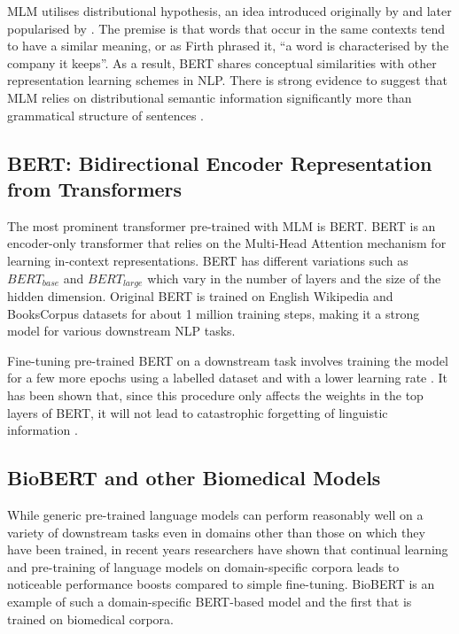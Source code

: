 \documentclass{article}
\begin{document}
MLM utilises distributional hypothesis, an idea introduced originally by \citet{harris1954distributional} and later popularised by \citet{firth1957synopsis}. The premise is that words that occur in the same contexts tend to have a similar meaning, or as Firth phrased it, ``a word is characterised by the company it keeps''.  As a result, BERT shares conceptual similarities with other representation learning schemes in NLP. There is strong evidence to suggest that MLM relies on distributional semantic information significantly more than grammatical structure of sentences \citep{sinha-etal-2021-masked}.   

\subsection{BERT: Bidirectional Encoder Representation from Transformers}
The most prominent transformer pre-trained with MLM is BERT. BERT is an encoder-only transformer that relies on the Multi-Head Attention mechanism for learning in-context representations. BERT has different variations such as $BERT_{base}$ and $BERT_{large}$ which vary in the number of layers and the size of the hidden dimension. Original BERT is trained on English Wikipedia and BooksCorpus datasets for about 1 million training steps, making it a strong model for various downstream NLP tasks. 

Fine-tuning pre-trained BERT on a downstream task involves training the model for a few more epochs using a labelled dataset and with a lower learning rate  \citep{sun2019fine}. It has been shown that, since this procedure only affects the weights in the top layers of BERT, it will not lead to catastrophic forgetting of linguistic information \citep{merchant2020happens}. 

\subsection{BioBERT and other Biomedical Models}

While generic pre-trained language models can perform reasonably well on a variety of downstream tasks even in domains other than those on which they have been trained, in recent years researchers have shown that continual learning and pre-training of language models on domain-specific corpora leads to noticeable performance boosts compared to simple fine-tuning. BioBERT is an example of such a domain-specific BERT-based model and the first that is trained on biomedical corpora. 
\end{document}
